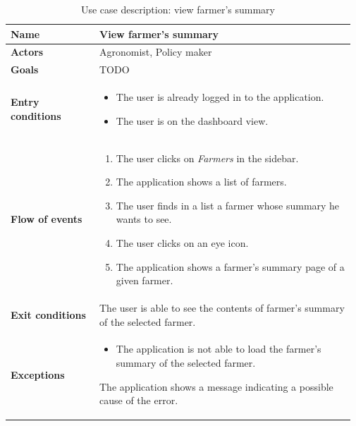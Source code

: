 \begin{table}[H]
    \centering
	\begin{tabular}{@{}p{0.25\linewidth} p{0.72\linewidth}@{}}
\toprule
		\textbf{Name}               & View farmer's summary \todo{discuss UC changes}\\
		\midrule
		\textbf{Actors}             & Agronomist, Policy maker\\
		\midrule
		\textbf{Goals}              & TODO \\
		\midrule
		
		\textbf{Entry conditions}   & \begin{itemize}[leftmargin=.4cm,noitemsep,topsep=0pt,before=\vspace{-3mm},after=\vspace{-4mm}]
		    \item The user is already logged in to the application.
		    \item The user is on the dashboard view.
		\end{itemize}\\
		\midrule
		
		\textbf{Flow of events}     & \begin{enumerate}[leftmargin=.4cm,noitemsep,topsep=0pt,before=\vspace{-3mm},after=\vspace{-4mm}]
		    \item The user clicks on \textit{Farmers} in the sidebar.
		    \item The application shows a list of farmers.
		    \item The user finds in a list a farmer whose summary he wants to see.
		    \item The user clicks on an eye icon.
		    \item The application shows a farmer's summary page of a given farmer.
		\end{enumerate}\\
		\midrule
		\textbf{Exit conditions}    & The user is able to see the contents of farmer's summary of the selected farmer. \\
		\midrule
		
		\textbf{Exceptions}         & 
	    \begin{itemize}[leftmargin=.4cm,noitemsep,topsep=0pt,before=\vspace{-3mm}]
		   \item The application is not able to load the farmer's summary of the selected farmer.
		\end{itemize}
		The application shows a message indicating a possible cause of the error.
		\\\bottomrule
	\end{tabular}
	\caption{Use case description: view farmer's summary} 
\end{table}

